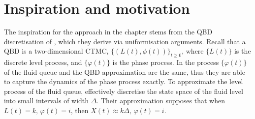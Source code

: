 \section{Inspiration and motivation}\label{sec: inspiration}
The inspiration for the approach in the chapter stems from the QBD discretisation of \cite{bo2013}, which they derive via uniformisation arguments. Recall that a QBD is a two-dimensional CTMC, \(\{(L(t),\phi(t))\}_{t\geq 0}\), where \(\{L(t)\}\) is the discrete level process, and \(\{\varphi(t)\}\) is the phase process. In \cite{bo2013} the process \(\{\varphi(t)\}\) of the fluid queue and the QBD approximation are the same, thus they are able to capture the dynamics of the phase process exactly. To approximate the level process of the fluid queue, \cite{bo2013} effectively discretise the state space of the fluid level into small intervals of width \(\Delta\). Their approximation supposes that when \(L(t)=k,\,\varphi(t)=i\), then \(X(t)\approx k\Delta,\,\varphi(t)=i\). 

